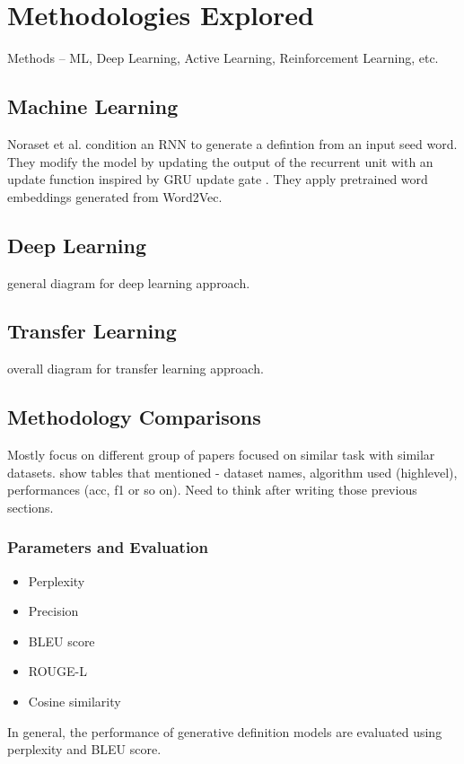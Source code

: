 \section{Methodologies Explored}
Methods -- ML, Deep Learning, Active Learning, Reinforcement Learning, etc.

\subsection{Machine Learning}
Noraset et al. condition an RNN to generate a defintion from an input seed word.
They modify the model by updating the output of the recurrent unit with an
update function inspired by GRU update gate \cite{noraset_definition_2016}. They
apply pretrained word embeddings generated from Word2Vec.

\subsection{Deep Learning}
general diagram for deep learning approach.

\subsection{Transfer Learning}
overall diagram for transfer learning approach.

\subsection{Methodology Comparisons}
Mostly focus on different group of papers focused on similar task with similar
datasets. show tables that mentioned - dataset names, algorithm used
(highlevel), performances (acc, f1 or so on). Need to think after writing those
previous sections.

\subsubsection{Parameters and Evaluation}
\begin{itemize}
    \item Perplexity
    \item Precision
    \item BLEU score
    \item ROUGE-L
    \item Cosine similarity
\end{itemize}

In general, the performance of generative definition models are evaluated using
perplexity and BLEU score.
